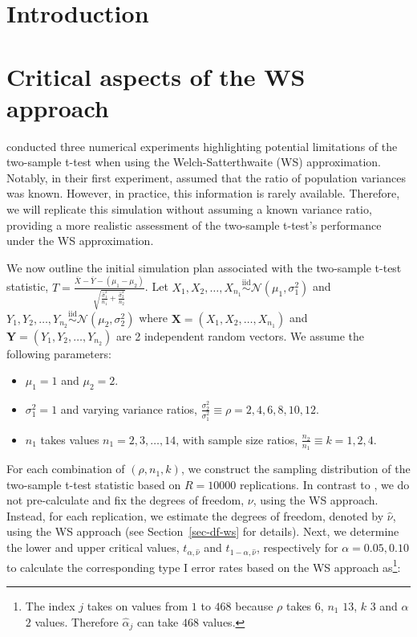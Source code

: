 \documentclass[
  12pt]{article}
\providecommand{\tightlist}{%
  \setlength{\itemsep}{0pt}\setlength{\parskip}{0pt}}\usepackage{longtable,booktabs,array}
\begin{document}
\section{Introduction}\label{sec-intro}

\section{Critical aspects of the WS
approach}\label{critical-aspects-of-the-ws-approach}

\citet{lloyd_2-sample_2013} conducted three numerical experiments
highlighting potential limitations of the two-sample t-test when using
the Welch-Satterthwaite (WS) approximation. Notably, in their first
experiment, \citet{lloyd_2-sample_2013} assumed that the ratio of
population variances was known. However, in practice, this information
is rarely available. Therefore, we will replicate this simulation
without assuming a known variance ratio, providing a more realistic
assessment of the two-sample t-test's performance under the WS
approximation.

We now outline the initial simulation plan associated with the
two-sample t-test statistic,
\(T = \frac{\overline{X} - \overline{Y} - (\mu_1 - \mu_2)}{\sqrt{\frac{\widehat{\sigma}^2_1}{n_1} + \frac{\widehat{\sigma}^2_2}{n_2}}}\).
Let
\(X_1, X_2, \ldots, X_{n_1} \overset{\text{iid}}{\sim} \mathcal{N}(\mu_1, \sigma_1^2)\)
and
\(Y_1, Y_2, \ldots, Y_{n_2} \overset{\text{iid}}{\sim} \mathcal{N}(\mu_2, \sigma_2^2)\)
where \(\mathbf{X} = (X_1, X_2, \ldots, X_{n_1})\) and
\(\mathbf{Y} = (Y_1, Y_2, \ldots, Y_{n_2})\) are 2 independent random
vectors. We assume the following parameters:

\begin{itemize}
\tightlist
\item
  \(\mu_1 = 1\) and \(\mu_2 = 2\).
\item
  \(\sigma^2_1 = 1\) and varying variance ratios,
  \(\frac{\sigma^2_2}{\sigma^2_1} \equiv \rho = 2, 4, 6, 8, 10, 12\).
\item
  \(n_1\) takes values \(n_1 = 2, 3, \ldots, 14\), with sample size
  ratios, \(\frac{n_2}{n_1} \equiv k = 1, 2, 4\).
\end{itemize}

For each combination of \((\rho, n_1, k)\), we construct the sampling
distribution of the two-sample t-test statistic based on \(R = 10000\)
replications. In contrast to \citet{lloyd_2-sample_2013}, we do not
pre-calculate and fix the degrees of freedom, \(\nu\), using the WS
approach. Instead, for each replication, we estimate the degrees of
freedom, denoted by \(\widehat{\nu}\), using the WS approach (see
Section~\ref{sec-df-ws} for details). Next, we determine the lower and
upper critical values, \(t_{\alpha,\widehat{\nu}}\) and
\(t_{1-\alpha,\widehat{\nu}}\), respectively for \(\alpha = 0.05, 0.10\)
to calculate the corresponding type I error rates based on the WS
approach as\footnote{The index \(j\) takes on values from \(1\) to
  \(468\) because \(\rho\) takes \(6\), \(n_1\) \(13\), \(k\) \(3\) and
  \(\alpha\) \(2\) values. Therefore \(\widehat{\alpha}_j\) can take
  \(468\) values.}:
\end{document}
